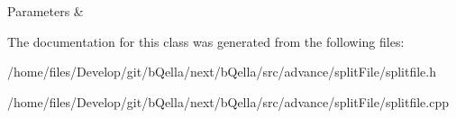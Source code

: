 \begin{DoxyParams}{Parameters}
{\em } & \\
\hline
\end{DoxyParams}


The documentation for this class was generated from the following files:\begin{DoxyCompactItemize}
\item 
/home/files/Develop/git/bQella/next/bQella/src/advance/splitFile/splitfile.h\item 
/home/files/Develop/git/bQella/next/bQella/src/advance/splitFile/splitfile.cpp\end{DoxyCompactItemize}
